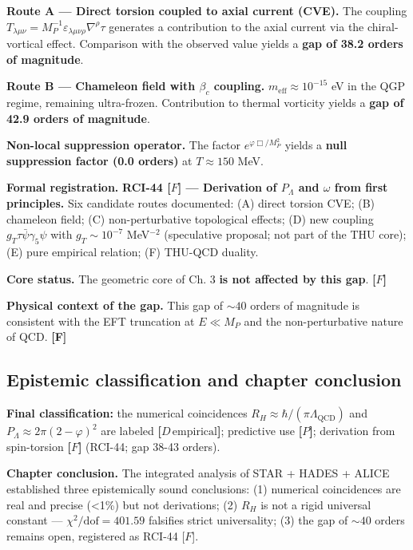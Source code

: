 ﻿\documentclass[11pt,letterpaper]{article}
\begin{document}
\textbf{Route A — Direct torsion coupled to axial current (CVE).} The coupling $T_{\lambda\mu\nu} = M_P^{-1}\varepsilon_{\lambda\mu\nu\rho}\nabla^\rho\tau$ generates a contribution to the axial current via the chiral-vortical effect. Comparison with the observed value yields a \textbf{gap of 38.2 orders of magnitude}.

\textbf{Route B — Chameleon field with $\beta_c$ coupling.} $m_{\text{eff}} \approx 10^{-15}$ eV in the QGP regime, remaining ultra-frozen. Contribution to thermal vorticity yields a \textbf{gap of 42.9 orders of magnitude}.

\textbf{Non-local suppression operator.} The factor $e^{\varphi \Box / M_P^2}$ yields a \textbf{null suppression factor (0.0 orders)} at $T \approx 150$ MeV.

\textbf{Formal registration.} \textbf{RCI-44 [$F$] — Derivation of $P_\Lambda$ and $\omega$ from first principles.} Six candidate routes documented: (A) direct torsion CVE; (B) chameleon field; (C) non-perturbative topological effects; (D) new coupling $g_T \tau\bar{\psi}\gamma_5\psi$ with $g_T \sim 10^{-7}$ MeV$^{-2}$ (speculative proposal; not part of the THU core); (E) pure empirical relation; (F) THU-QCD duality.

\textbf{Core status.} The geometric core of Ch. 3 \textbf{is not affected by this gap}. \textbf{[$F$]}

\textbf{Physical context of the gap.} This gap of $\sim 40$ orders of magnitude is consistent with the EFT truncation at $E \ll M_P$ and the non-perturbative nature of QCD. \textbf{[F]}
\subsection{Epistemic classification and chapter conclusion}
\textbf{Final classification:} the numerical coincidences $R_H \approx \hbar/(\pi \Lambda_{\text{QCD}})$ and $P_\Lambda \approx 2\pi(2-\varphi)^2$ are labeled \textbf{[$D\,\text{empirical}$]}; predictive use \textbf{[$P$]}; derivation from spin-torsion \textbf{[$F$]} (RCI-44; gap 38-43 orders).

\textbf{Chapter conclusion.} The integrated analysis of STAR + HADES + ALICE established three epistemically sound conclusions: (1) numerical coincidences are real and precise (<1\%) but not derivations; (2) $R_H$ is not a rigid universal constant — $\chi^2/\mathrm{dof} = 401.59$ falsifies strict universality; (3) the gap of $\sim 40$ orders remains open, registered as RCI-44 [$F$].
\end{document}
